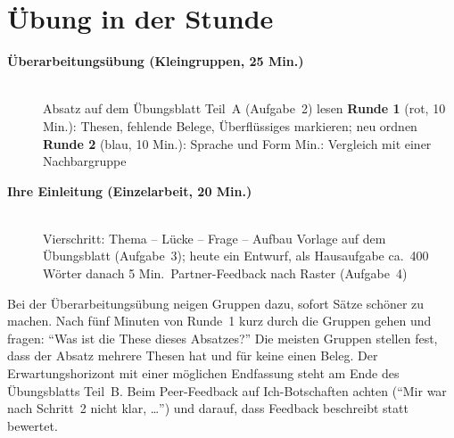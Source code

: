 \section{Übung in der Stunde}
\begin{description}
\item[{\rot\bf Überarbeitungsübung (Kleingruppen, 25 Min.)}]~\\[-\lblskip]
\bi
  \ite Absatz auf dem Übungsblatt Teil~A (Aufgabe~2) lesen
  \ite \textbf{Runde 1} (rot, 10 Min.): Thesen, fehlende Belege,
    Überflüssiges markieren; neu ordnen
  \ite \textbf{Runde 2} (blau, 10 Min.): Sprache und Form
   Min.: Vergleich mit einer Nachbargruppe
\ei
\os{\newpage}

\item[{\rot\bf Ihre Einleitung (Einzelarbeit, 20 Min.)}]~\\[-\lblskip]
\bi
  \ite Vierschritt: Thema -- Lücke -- Frage -- Aufbau
  \ite Vorlage auf dem Übungsblatt (Aufgabe~3); heute ein Entwurf, als
    Hausaufgabe ca.\ 400 Wörter
  \ite danach 5 Min.\ Partner-Feedback nach Raster (Aufgabe~4)
\ei
\os{\newpage}
\end{description}

\begin{lehrhinweis}
Bei der Überarbeitungsübung neigen Gruppen dazu, sofort Sätze schöner zu
machen. Nach fünf Minuten von Runde~1 kurz durch die Gruppen gehen und
fragen: \enquote{Was ist die These dieses Absatzes?} Die meisten Gruppen
stellen fest, dass der Absatz mehrere Thesen hat und für keine einen Beleg.
Der Erwartungshorizont mit einer möglichen Endfassung steht am Ende des
Übungsblatts Teil~B. Beim Peer-Feedback auf Ich-Botschaften achten
(\enquote{Mir war nach Schritt~2 nicht klar, \ldots}) und darauf, dass
Feedback beschreibt statt bewertet.
\end{lehrhinweis}

